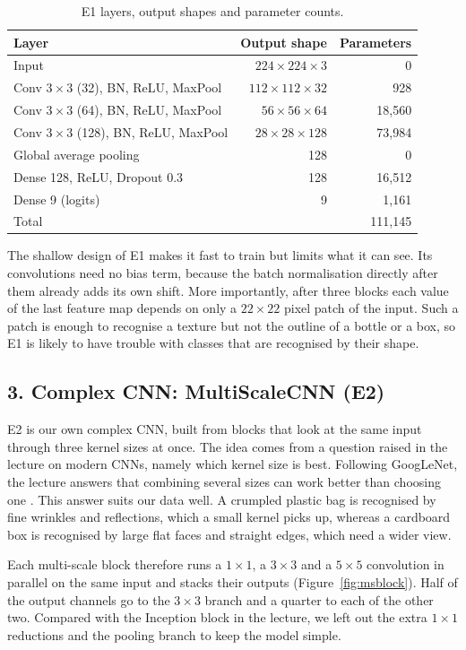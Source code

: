 \documentclass{article}
\begin{document}
\begin{table}[H]
\centering
\caption{E1 layers, output shapes and parameter counts.}
\label{tab:e1}
\begin{tabular}{lrr}
\toprule
Layer & Output shape & Parameters \\
\midrule
Input & $224\times224\times3$ & 0 \\
Conv $3\times3$ (32), BN, ReLU, MaxPool & $112\times112\times32$ & 928 \\
Conv $3\times3$ (64), BN, ReLU, MaxPool & $56\times56\times64$ & 18,560 \\
Conv $3\times3$ (128), BN, ReLU, MaxPool & $28\times28\times128$ & 73,984 \\
Global average pooling & 128 & 0 \\
Dense 128, ReLU, Dropout 0.3 & 128 & 16,512 \\
Dense 9 (logits) & 9 & 1,161 \\
\midrule
Total & & 111,145 \\
\bottomrule
\end{tabular}
\end{table}

The shallow design of E1 makes it fast to train but limits what it can see. Its convolutions need no bias term, because the batch normalisation directly after them already adds its own shift. More importantly, after three blocks each value of the last feature map depends on only a $22\times22$ pixel patch of the input. Such a patch is enough to recognise a texture but not the outline of a bottle or a box, so E1 is likely to have trouble with classes that are recognised by their shape.

\subsection{3. Complex CNN: MultiScaleCNN (E2)}

E2 is our own complex CNN, built from blocks that look at the same input through three kernel sizes at once. The idea comes from a question raised in the lecture on modern CNNs, namely which kernel size is best. Following GoogLeNet, the lecture answers that combining several sizes can work better than choosing one \cite{lec52, inception}. This answer suits our data well. A crumpled plastic bag is recognised by fine wrinkles and reflections, which a small kernel picks up, whereas a cardboard box is recognised by large flat faces and straight edges, which need a wider view.

Each multi-scale block therefore runs a $1\times1$, a $3\times3$ and a $5\times5$ convolution in parallel on the same input and stacks their outputs (Figure~\ref{fig:msblock}). Half of the output channels go to the $3\times3$ branch and a quarter to each of the other two. Compared with the Inception block in the lecture, we left out the extra $1\times1$ reductions and the pooling branch to keep the model simple.
\end{document}
